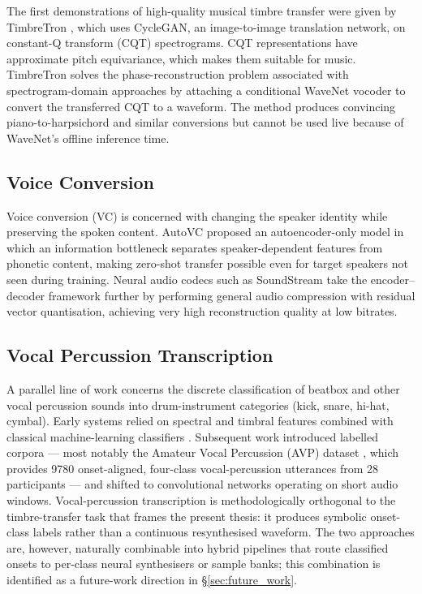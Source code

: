 \documentclass[a4paper,11pt,oneside,openany]{book}
\begin{document}
The first demonstrations of high-quality musical timbre transfer were given by TimbreTron \parencite{huang2018timbretron}, which uses CycleGAN, an image-to-image translation network, on constant-Q transform (CQT) spectrograms. CQT representations have approximate pitch equivariance, which makes them suitable for music. TimbreTron solves the phase-reconstruction problem associated with spectrogram-domain approaches by attaching a conditional WaveNet vocoder to convert the transferred CQT to a waveform. The method produces convincing piano-to-harpsichord and similar conversions but cannot be used live because of WaveNet's offline inference time.

\subsection*{Voice Conversion}

Voice conversion (VC) is concerned with changing the speaker identity while preserving the spoken content. AutoVC \parencite{qian2019autovc} proposed an autoencoder-only model in which an information bottleneck separates speaker-dependent features from phonetic content, making zero-shot transfer possible even for target speakers not seen during training. Neural audio codecs such as SoundStream \parencite{zeghidour2022soundstream} take the encoder--decoder framework further by performing general audio compression with residual vector quantisation, achieving very high reconstruction quality at low bitrates.

\subsection*{Vocal Percussion Transcription}\label{subsec:vpt}

A parallel line of work concerns the discrete classification of beatbox and other vocal percussion sounds into drum-instrument categories (kick, snare, hi-hat, cymbal). Early systems relied on spectral and timbral features combined with classical machine-learning classifiers \parencite{stowell2008beatboxing}. Subsequent work introduced labelled corpora --- most notably the Amateur Vocal Percussion (AVP) dataset \parencite{delgado2019avp}, which provides 9780 onset-aligned, four-class vocal-percussion utterances from 28 participants --- and shifted to convolutional networks operating on short audio windows. Vocal-percussion transcription is methodologically orthogonal to the timbre-transfer task that frames the present thesis: it produces symbolic onset-class labels rather than a continuous resynthesised waveform. The two approaches are, however, naturally combinable into hybrid pipelines that route classified onsets to per-class neural synthesisers or sample banks; this combination is identified as a future-work direction in \S\ref{sec:future_work}.
\end{document}
